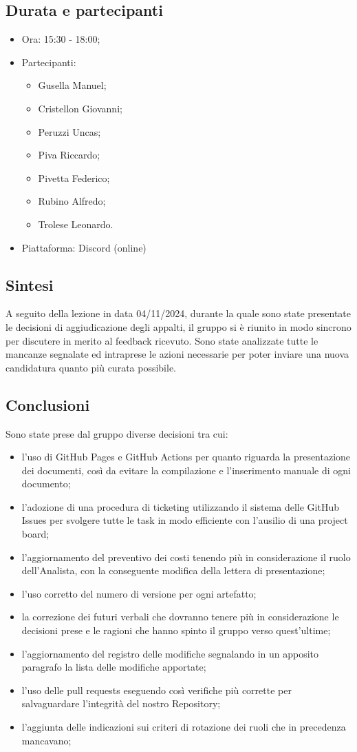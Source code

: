 \documentclass[12pt]{article}
\begin{document}
\subsection{Durata e partecipanti}
\begin{itemize}
\item Ora: 15:30 - 18:00;
\item Partecipanti: 	
	\begin{itemize}
	\item Gusella Manuel;
	\item Cristellon Giovanni;
	\item Peruzzi Uncas;
	\item Piva Riccardo;
	\item Pivetta Federico;
	\item Rubino Alfredo;
	\item Trolese Leonardo.
	\end{itemize}
\item Piattaforma: Discord (online)
\end{itemize}
\subsection{Sintesi}
A seguito della lezione in data 04/11/2024, durante la quale sono state presentate le decisioni di aggiudicazione degli appalti, il gruppo si è riunito in modo sincrono per discutere in merito al feedback ricevuto. Sono state analizzate tutte le mancanze segnalate ed intraprese le azioni necessarie per poter inviare una nuova candidatura quanto più curata possibile.
\subsection{Conclusioni}
Sono state prese dal gruppo diverse decisioni tra cui:
\begin{itemize}
\item l'uso di GitHub Pages e GitHub Actions per quanto riguarda la presentazione dei documenti, così da evitare la compilazione e l'inserimento manuale di ogni documento;
\item l'adozione di una procedura di ticketing utilizzando il sistema delle GitHub Issues per svolgere tutte le task in modo efficiente con l'ausilio di una project board;
\item l'aggiornamento del preventivo dei costi tenendo più in considerazione il ruolo dell'Analista, con la conseguente modifica della lettera di presentazione;
\item l'uso corretto del numero di versione per ogni artefatto;
\item la correzione dei futuri verbali che dovranno tenere più in considerazione le decisioni prese e le ragioni che hanno spinto il gruppo verso quest'ultime; 
\item l'aggiornamento del registro delle modifiche segnalando in un apposito paragrafo la lista delle modifiche apportate;
\item l'uso delle pull requests eseguendo così verifiche più corrette per salvaguardare l'integrità del nostro Repository;
\item l'aggiunta delle indicazioni sui criteri di rotazione dei ruoli che in precedenza mancavano;
\end{itemize}
\end{document}
